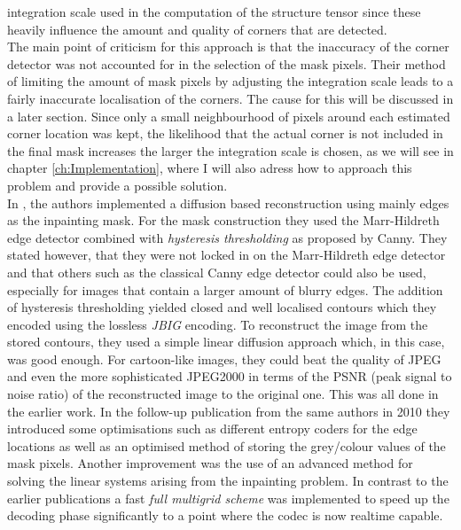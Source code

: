 integration scale used in the computation of the structure tensor since these heavily influence the
amount and quality of corners that are detected. \\
The main point of criticism for this approach is that the inaccuracy of the corner 
detector was not accounted for in the selection of the mask
pixels.\cite{conversation} Their method of limiting the amount of mask pixels by adjusting the integration scale leads
to a fairly inaccurate localisation of the corners. The cause for this will be discussed in
a later section.
Since only a small neighbourhood of pixels around each estimated corner
location was kept, the likelihood that the actual corner is not included in the final mask
increases the larger the integration scale is chosen, as we will see in chapter
\ref{ch:Implementation}, where I will also adress how to approach this problem and provide a
possible solution.\\


In \cite{mainberger09, mainberger10}, the authors implemented a diffusion based reconstruction
using mainly edges as the inpainting mask. For the mask construction they used the Marr-Hildreth
edge detector\cite{marr80} combined with \textit{hysteresis thresholding} as proposed by Canny\cite{canny86}.
They stated however, that they were not locked in on the Marr-Hildreth edge detector and that
others such as the classical Canny edge detector could also be used, especially for images that
contain a larger amount of blurry edges. The addition of hysteresis thresholding yielded closed and
well localised contours which they encoded using the lossless \textit{JBIG} encoding\cite{jbig}.
To reconstruct the image from the stored contours, they used a simple linear diffusion approach
which, in this case, was good enough. For cartoon-like images, they could beat the quality of
JPEG and even the more sophisticated JPEG2000 in terms of the PSNR (peak signal to noise ratio) of the reconstructed image to the
original one. This was all done in the earlier work\cite{mainberger09}. In the follow-up
publication from the same authors in 2010 they introduced some optimisations such as different
entropy coders for the edge locations as well as an optimised method of storing the grey/colour
values of the mask pixels. Another improvement was the use of an advanced method for solving the
linear systems arising from the inpainting problem. In contrast to the earlier publications a fast
\textit{full multigrid scheme} was implemented to speed up the decoding phase significantly to 
a point where the codec is now realtime capable.\\

